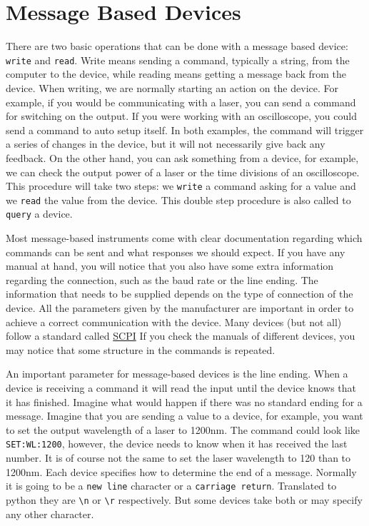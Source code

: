 \section{Message Based Devices}\label{message-basedevices}
There are two basic operations that can be done with a message based
device: \texttt{write} and \texttt{read}. Write means sending a command,
typically a string, from the computer to the device, while reading means
getting a message back from the device. When writing, we are normally
starting an action on the device. For example, if you would be
communicating with a laser, you can send a command for switching on the
output. If you were working with an oscilloscope, you could send a
command to auto setup itself. In both examples, the command will trigger
a series of changes in the device, but it will not necessarily give back
any feedback. On the other hand, you can ask something from a device,
for example, we can check the output power of a laser or the time
divisions of an oscilloscope. This procedure will take two steps: we
\texttt{write} a command asking for a value and we \texttt{read} the
value from the device. This double step procedure is also called to
\texttt{query} a device.

Most message-based instruments come with clear documentation regarding
which commands can be sent and what responses we should expect. If you
have any manual at hand, you will notice that you also have some extra
information regarding the connection, such as the baud rate or the line
ending. The information that needs to be supplied depends on the type of
connection of the device. All the parameters given by the manufacturer
are important in order to achieve a correct communication with the
device. Many devices (but not all) follow a standard called 
\href{https://en.wikipedia.org/wiki/Standard_Commands_for_Programmable_Instruments}{SCPI} 
If you check the manuals of different devices, you may notice that some
structure in the commands is repeated.

An important parameter for message-based devices is the line ending.
When a device is receiving a command it will read the input until the
device knows that it has finished. Imagine what would happen if there
was no standard ending for a message. Imagine that you are sending a
value to a device, for example, you want to set the output wavelength of
a laser to 1200nm. The command could look like \texttt{SET:WL:1200},
however, the device needs to know when it has received the last number.
It is of course not the same to set the laser wavelength to 120 than to
1200nm. Each device specifies how to determine the end of a message.
Normally it is going to be a \texttt{new\ line} character or a
\texttt{carriage\ return}. Translated to python they are
\texttt{\textbackslash{}n} or \texttt{\textbackslash{}r} respectively.
But some devices take both or may specify any other character.

